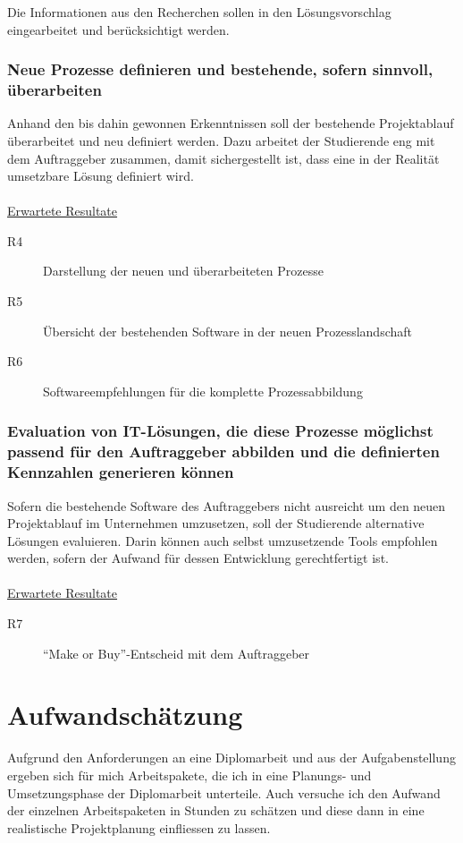 Die Informationen aus den Recherchen sollen in den Lösungsvorschlag eingearbeitet
und berücksichtigt werden.

\subsubsection{Neue Prozesse definieren und bestehende, sofern sinnvoll, überarbeiten}
Anhand den bis dahin gewonnen Erkenntnissen soll der bestehende Projektablauf
überarbeitet und neu definiert werden. Dazu arbeitet der Studierende eng mit
dem Auftraggeber zusammen, damit sichergestellt ist, dass eine in der Realität
umsetzbare Lösung definiert wird.
\\\\
\underline{Erwartete Resultate}

\begin{description}
    \item[R4] Darstellung der neuen und überarbeiteten Prozesse
    \item[R5] Übersicht der bestehenden Software in der neuen Prozesslandschaft
    \item[R6] Softwareempfehlungen für die komplette Prozessabbildung
\end{description}

\subsubsection{Evaluation von IT-Lösungen, die diese Prozesse möglichst passend 
    für den Auftraggeber abbilden und die definierten Kennzahlen generieren können}
Sofern die bestehende Software des Auftraggebers nicht ausreicht um den neuen
Projektablauf im Unternehmen umzusetzen, soll der Studierende alternative 
Lösungen evaluieren. Darin können auch selbst umzusetzende Tools empfohlen 
werden, sofern der Aufwand für dessen Entwicklung gerechtfertigt ist.
\\\\
\underline{Erwartete Resultate}

\begin{description}
    \item[R7] ``Make or Buy''-Entscheid mit dem Auftraggeber
\end{description}

\section{Aufwandschätzung}
Aufgrund den Anforderungen an eine Diplomarbeit und aus der Aufgabenstellung
ergeben sich für mich Arbeitspakete, die ich in eine Planungs- und Umsetzungsphase
der Diplomarbeit unterteile. Auch versuche ich den Aufwand der einzelnen
Arbeitspaketen in Stunden zu schätzen und diese dann in eine realistische 
Projektplanung einfliessen zu lassen.

